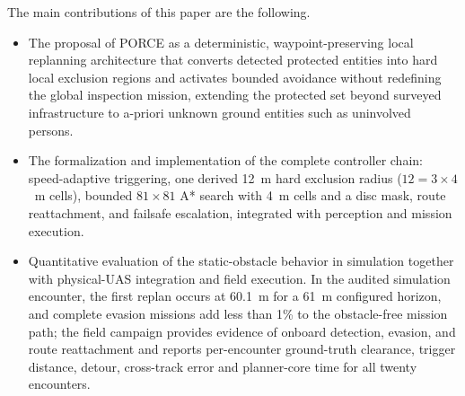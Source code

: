 \documentclass[electronics,article,submit,moreauthors]{Definitions/mdpi}
\DeclareRobustCommand{\deleted}[1]{}%
\DeclareRobustCommand{\added}[1]{#1}%
\DeclareRobustCommand{\deleted}[1]{\textcolor{black}{\sout{#1}}}
\DeclareRobustCommand{\added}[1]{\textcolor{green!50!black}{#1}}
\def\deleted#1{}%
\def\added#1{#1}%
\begin{document}
The main contributions of this paper are the following.
\begin{itemize}
    \item \deleted{The definition}\added{The proposal} of PORCE as a deterministic, waypoint-preserving local replanning \deleted{method for real-time UAV obstacle}\added{architecture that converts detected protected entities into hard local exclusion regions and activates bounded} avoidance \deleted{in power-line}\added{without redefining the global} inspection \deleted{missions, explicitly motivated by European ground-risk and no-overflight concerns.}\added{mission, extending the protected set beyond surveyed infrastructure to a-priori unknown ground entities such as uninvolved persons.}
    \item \deleted{A formal and reproducible description of how the method is}\added{The formalization and implementation of the complete controller chain: speed-adaptive triggering, one derived 12~m hard exclusion radius ($12 = 3\times4$~m cells), bounded $81\times81$ A* search with 4~m cells and a disc mask, route reattachment, and failsafe escalation,} integrated with perception\deleted{, Mission execution, and evaluation of results inside a validated simulation environment.}\added{ and mission execution.}
    \item \deleted{Real-world scenario tests, where the results obtained support the transferability}\added{Quantitative evaluation} of the \deleted{approach from}\added{static-obstacle behavior in} simulation \deleted{to real UAV operation.}\added{together with physical-UAS integration and field execution. In the audited simulation encounter, the first replan occurs at 60.1~m for a 61~m configured horizon, and complete evasion missions add less than 1\% to the obstacle-free mission path; the field campaign provides evidence of onboard detection, evasion, and route reattachment and reports per-encounter ground-truth clearance, trigger distance, detour, cross-track error and planner-core time for all twenty encounters.}
\end{itemize}
\end{document}
